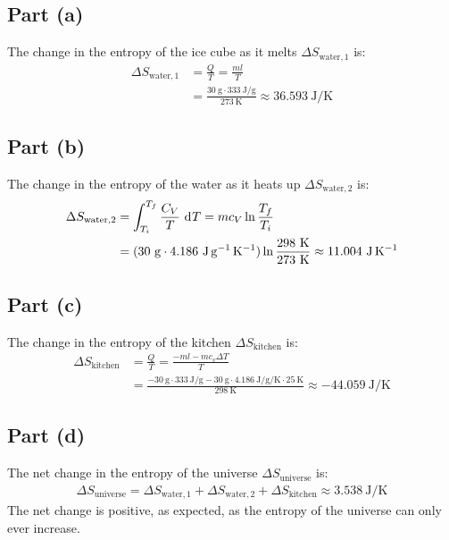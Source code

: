 \documentclass{article}
\begin{document}
\clearpage

\subsection*{Part (a)}
The change in the entropy of the ice cube as it melts $\Delta S_{\text{water},1}$ is:
\begin{equation}
    \begin{split}
        \Delta S_{\text{water},1} & = \frac{Q}{T} = \frac{ml}{T} \\
        & = \frac{30~\unit{\gram} \cdot 333~\unit{\joule\per\gram}}{273~\unit{\kelvin}} \approx 36.593~\unit{\joule\per\kelvin}
    \end{split}
\end{equation}
\subsection*{Part (b)}
The change in the entropy of the water as it heats up $\Delta S_{\text{water},2}$ is:
\begin{equation}
    \begin{split}
        \Delta S_{\text{water},2} & = \int_{T_i}^{T_f} \frac{C_V}{T} \, \diff{T} = mc_V\ln\frac{T_f}{T_i} \\
        & = (30~\unit{\gram} \cdot 4.186~\unit{\joule\per\gram\per\kelvin})\ln\frac{298~\unit{\kelvin}}{273~\unit{\kelvin}} \approx 11.004~\unit{\joule\per\kelvin}
    \end{split}
\end{equation}
\subsection*{Part (c)}
The change in the entropy of the kitchen $\Delta S_{\text{kitchen}}$ is:
\begin{equation}
    \begin{split}
        \Delta S_{\text{kitchen}} & = \frac{Q}{T} = \frac{-ml - mc_v\Delta T}{T} \\
        & = \frac{-30~\unit{\gram} \cdot 333~\unit{\joule\per\gram} - 30~\unit{\gram} \cdot 4.186~\unit{\joule\per\gram\per\kelvin} \cdot 25~\unit{\kelvin}}{298~\unit{\kelvin}} \approx -44.059~\unit{\joule\per\kelvin}
    \end{split}
\end{equation}
\subsection*{Part (d)}
The net change in the entropy of the universe $\Delta S_{\text{universe}}$ is:
\begin{equation}
    \begin{split}
        \Delta S_{\text{universe}} = \Delta S_{\text{water},1} + \Delta S_{\text{water},2} + \Delta S_{\text{kitchen}} \approx 3.538~\unit{\joule\per\kelvin}
    \end{split}
\end{equation}
The net change is positive, as expected, as the entropy of the universe can only ever increase.
\end{document}
